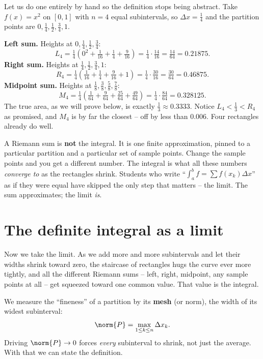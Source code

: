 \begin{labbox}
Let us do one entirely by hand so the definition stops being abstract. Take
$f(x) = x^2$ on $[0,1]$ with $n = 4$ equal subintervals, so $\Delta x =
\tfrac14$ and the partition points are $0, \tfrac14, \tfrac12, \tfrac34, 1$.

\textbf{Left sum.} Heights at $0,\tfrac14,\tfrac12,\tfrac34$:
\[
  L_4 = \tfrac14\!\left(0^2 + \tfrac1{16} + \tfrac14 + \tfrac9{16}\right)
      = \tfrac14 \cdot \tfrac{14}{16} = \tfrac{14}{64} = 0.21875.
\]
\textbf{Right sum.} Heights at $\tfrac14,\tfrac12,\tfrac34,1$:
\[
  R_4 = \tfrac14\!\left(\tfrac1{16} + \tfrac14 + \tfrac9{16} + 1\right)
      = \tfrac14 \cdot \tfrac{30}{16} = \tfrac{30}{64} = 0.46875.
\]
\textbf{Midpoint sum.} Heights at $\tfrac18,\tfrac38,\tfrac58,\tfrac78$:
\[
  M_4 = \tfrac14\!\left(\tfrac1{64} + \tfrac9{64} + \tfrac{25}{64}
        + \tfrac{49}{64}\right) = \tfrac14 \cdot \tfrac{84}{64} = 0.328125.
\]
The true area, as we will prove below, is exactly $\tfrac13 \approx 0.3333$.
Notice $L_4 < \tfrac13 < R_4$ as promised, and $M_4$ is by far the closest --
off by less than $0.006$. Four rectangles already do well.
\end{labbox}

\begin{trapbox}
A Riemann sum is \textbf{not} the integral. It is one finite approximation,
pinned to a particular partition and a particular set of sample points. Change
the sample points and you get a different number. The integral is what all these
numbers \emph{converge to} as the rectangles shrink. Students who write
``$\int_a^b f = \sum f(x_k)\Delta x$'' as if they were equal have skipped the
only step that matters -- the limit. The sum approximates; the limit \emph{is}.
\end{trapbox}

\section{The definite integral as a limit}
\label{ch20:def-integral}

Now we take the limit. As we add more and more subintervals and let their widths
shrink toward zero, the staircase of rectangles hugs the curve ever more tightly,
and all the different Riemann sums -- left, right, midpoint, any sample points at
all -- get squeezed toward one common value. That value is the integral.

We measure the ``fineness'' of a partition by its \textbf{mesh} (or norm), the
width of its widest subinterval:
\[
  \norm{P} = \max_{1 \le k \le n} \Delta x_k.
\]
Driving $\norm{P} \to 0$ forces \emph{every} subinterval to shrink, not just the
average. With that we can state the definition.

